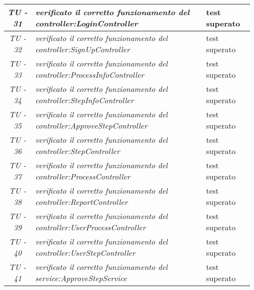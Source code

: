 \begin{small}\centering
\begin{tabular}{|c|p{8.0cm}|p{2.0cm}|}
\hline
\textit{TU - 31} &
\textit{verificato il corretto funzionamento del controller:LoginController} & test superato \\
\hline

\textit{TU - 32} &
\textit{verificato il corretto funzionamento del controller:SignUpController} & test superato \\
\hline

\textit{TU - 33} &
\textit{verificato il corretto funzionamento del controller:ProcessInfoController} & test superato \\
\hline

\textit{TU - 34} &
\textit{verificato il corretto funzionamento del controller:StepInfoController} & test superato \\
\hline

\textit{TU - 35} &
\textit{verificato il corretto funzionamento del controller:ApproveStepController} & test superato \\
\hline

\textit{TU - 36} &
\textit{verificato il corretto funzionamento del controller:StepController} & test superato \\
\hline

\textit{TU - 37} &
\textit{verificato il corretto funzionamento del controller:ProcessController} & test superato \\
\hline

\textit{TU - 38} &
\textit{verificato il corretto funzionamento del controller:ReportController} & test superato \\
\hline

\textit{TU - 39} &
\textit{verificato il corretto funzionamento del controller:UserProcessController} & test superato \\
\hline

\textit{TU - 40} &
\textit{verificato il corretto funzionamento del controller:UserStepController} & test superato \\
\hline

\textit{TU - 41} &
\textit{verificato il corretto funzionamento del service:ApproveStepService} & test superato \\
\hline
\end{tabular}\\
\end{small}

